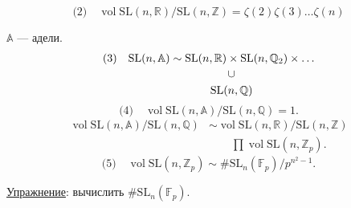 \[
\text{(2)}\quad
\operatorname{vol}\mathrm{SL}(n,\mathbb R)/\mathrm{SL}(n,\mathbb Z)
=\zeta(2)\zeta(3)\ldots\zeta(n)
\]

\(\mathbb A\) — адели.
\[
\begin{aligned}
\text{(3)}\quad\mathrm{SL}(n,\mathbb A)&\sim
\mathrm{SL}(n,\mathbb R)\times\mathrm{SL}(n,\mathbb Q_2)\times\ldots\\[-2pt]
 &\hspace{3.6em}\begin{gathered}\cup\\\mathrm{SL}(n,\mathbb Q)\end{gathered}
\end{aligned}
\]
\[
\text{(4)}\quad
\operatorname{vol}\mathrm{SL}(n,\mathbb A)/\mathrm{SL}(n,\mathbb Q)=1.
\]
\[
\begin{aligned}
\operatorname{vol}\mathrm{SL}(n,\mathbb A)/\mathrm{SL}(n,\mathbb Q)
 &\sim
 \operatorname{vol}\mathrm{SL}(n,\mathbb R)/\mathrm{SL}(n,\mathbb Z)\\
 &\qquad \prod\operatorname{vol}\mathrm{SL}(n,\mathbb Z_p).
\end{aligned}
\]
\[
\text{(5)}\quad
\operatorname{vol}\mathrm{SL}(n,\mathbb Z_p)
\sim\#\mathrm{SL}_n(\mathbb F_p)/p^{n^2-1}.
\]

\uline{Упражнение}: вычислить \(\#\mathrm{SL}_n(\mathbb F_p)\).


